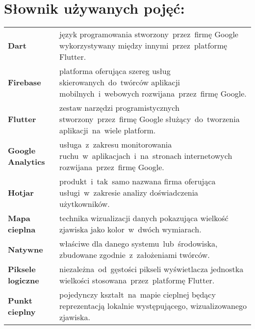 \section*{Słownik używanych pojęć:}

\begin{table}[H]
\begin{tabularx}{\textwidth}{ m{2.8cm} X }
	\textbf{Dart} \dotfill & język programowania stworzony~przez~firmę Google wykorzystywany między innymi~przez~platformę Flutter. \\
	\textbf{Firebase} \dotfill & platforma oferująca szereg usług skierowanych~do~twórców aplikacji mobilnych~i~webowych rozwijana~przez~firmę Google. \\
	\textbf{Flutter} \dotfill & zestaw narzędzi programistycznych stworzony~przez~firmę Google służący~do~tworzenia aplikacji~na~wiele platform. \\
	\textbf{Google Analytics} \dotfill & usługa~z~zakresu monitorowania ruchu~w~aplikacjach~i~na~stronach internetowych rozwijana~przez~firmę Google. \\
	\textbf{Hotjar} \dotfill & produkt~i~tak~samo nazwana firma oferująca usługi~w~zakresie analizy doświadczenia użytkowników. \\
	\textbf{Mapa cieplna} \dotfill & technika wizualizacji danych pokazująca wielkość zjawiska jako kolor~w~dwóch wymiarach. \\
	\textbf{Natywne} \dotfill & właściwe dla danego systemu~lub~środowiska, zbudowane zgodnie~z~założeniami twórców. \\
	\textbf{Piksele logiczne} \dotfill & niezależna~od~gęstości pikseli wyświetlacza jednostka wielkości stosowana~przez~platformę Flutter. \\
	\textbf{Punkt cieplny} \dotfill & pojedynczy kształt~na~mapie cieplnej będący reprezentacją lokalnie występującego, wizualizowanego zjawiska. \\
\end{tabularx}
\end{table}
